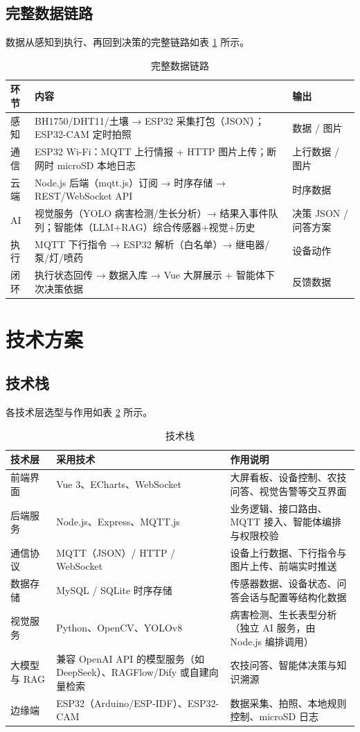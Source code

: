 ﻿\documentclass[11pt]{ctexart}
\begin{document}
\subsection{完整数据链路}
数据从感知到执行、再回到决策的完整链路如表 \ref{tab:datapath} 所示。
\begin{longtable}{p{1.5cm}p{11.0cm}p{2.6cm}}
  \caption{完整数据链路}\label{tab:datapath}\\
  \toprule
  环节 & 内容 & 输出 \\
  \midrule
  感知 & BH1750/DHT11/土壤 → ESP32 采集打包（JSON）；ESP32-CAM 定时拍照 & 数据 / 图片 \\
  通信 & ESP32 Wi-Fi：MQTT 上行情报 + HTTP 图片上传；断网时 microSD 本地日志 & 上行数据 / 图片 \\
  云端 & Node.js 后端（mqtt.js）订阅 → 时序存储 → REST/WebSocket API & 时序数据 \\
  AI & 视觉服务（YOLO 病害检测/生长分析）→ 结果入事件队列；智能体（LLM+RAG）综合传感器+视觉+历史 & 决策 JSON / 问答方案 \\
  执行 & MQTT 下行指令 → ESP32 解析（白名单）→ 继电器/泵/灯/喷药 & 设备动作 \\
  闭环 & 执行状态回传 → 数据入库 → Vue 大屏展示 + 智能体下次决策依据 & 反馈数据 \\
  \bottomrule
\end{longtable}

\section{技术方案}
\subsection{技术栈}
各技术层选型与作用如表 \ref{tab:stack} 所示。
\begin{longtable}{p{2.4cm}p{4.8cm}p{7.6cm}}
  \caption{技术栈}\label{tab:stack}\\
  \toprule
  技术层 & 采用技术 & 作用说明 \\
  \midrule
  前端界面 & Vue 3、ECharts、WebSocket & 大屏看板、设备控制、农技问答、视觉告警等交互界面 \\
  后端服务 & Node.js、Express、MQTT.js & 业务逻辑、接口路由、MQTT 接入、智能体编排与权限校验 \\
  通信协议 & MQTT（JSON）/ HTTP / WebSocket & 设备上行数据、下行指令与图片上传、前端实时推送 \\
  数据存储 & MySQL / SQLite 时序存储 & 传感器数据、设备状态、问答会话与配置等结构化数据 \\
  视觉服务 & Python、OpenCV、YOLOv8 & 病害检测、生长表型分析（独立 AI 服务，由 Node.js 编排调用） \\
  大模型与 RAG & 兼容 OpenAI API 的模型服务（如 DeepSeek）、RAGFlow/Dify 或自建向量检索 & 农技问答、智能体决策与知识溯源 \\
  边缘端 & ESP32（Arduino/ESP-IDF）、ESP32-CAM & 数据采集、拍照、本地规则控制、microSD 日志 \\
  \bottomrule
\end{longtable}
\end{document}
